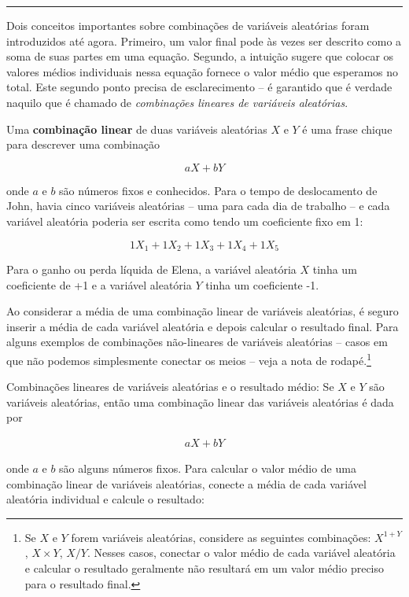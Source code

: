 \documentclass[
]{book}
\theoremstyle{definition}
\theoremstyle{definition}
\theoremstyle{definition}
\theoremstyle{definition}
\theoremstyle{remark}
\begin{document}
\begin{center}\rule{0.5\linewidth}{0.5pt}\end{center}

Dois conceitos importantes sobre combinações de variáveis aleatórias foram introduzidos até agora. Primeiro, um valor final pode às vezes ser descrito como a soma de suas partes em uma equação. Segundo, a intuição sugere que colocar os valores médios individuais nessa equação fornece o valor médio que esperamos no total. Este segundo ponto precisa de esclarecimento -- é garantido que é verdade naquilo que é chamado de \emph{combinações lineares de variáveis aleatórias}.

Uma \textbf{combinação linear} de duas variáveis aleatórias \(X\) e \(Y\) é uma frase chique para descrever uma combinação

\[ aX + bY\]

onde \(a\) e \(b\) são números fixos e conhecidos. Para o tempo de deslocamento de John, havia cinco variáveis aleatórias -- uma para cada dia de trabalho -- e cada variável aleatória poderia ser escrita como tendo um coeficiente fixo em 1:

\[1X_1 + 1 X_2 + 1 X_3 + 1 X_4 + 1 X_5\]

Para o ganho ou perda líquida de Elena, a variável aleatória \(X\) tinha um coeficiente de +1 e a variável aleatória \(Y\) tinha um coeficiente -1.

Ao considerar a média de uma combinação linear de variáveis aleatórias, é seguro inserir a média de cada variável aleatória e depois calcular o resultado final. Para alguns exemplos de combinações não-lineares de variáveis aleatórias -- casos em que não podemos simplesmente conectar os meios -- veja a nota de rodapé.\footnote{Se \(X\) e \(Y\) forem variáveis aleatórias, considere as seguintes combinações: \(X^{1+Y}\), \(X\times Y\), \(X/Y\). Nesses casos, conectar o valor médio de cada variável aleatória e calcular o resultado geralmente não resultará em um valor médio preciso para o resultado final.}

Combinações lineares de variáveis aleatórias e o resultado médio: Se \(X\) e \(Y\) são variáveis aleatórias, então uma combinação linear das variáveis aleatórias é dada por

\begin{align}
aX + bY
\label{eq:linComboOfRandomVariablesXAndY}
\end{align}

onde \(a\) e \(b\) são alguns números fixos. Para calcular o valor médio de uma combinação linear de variáveis aleatórias, conecte a média de cada variável aleatória individual e calcule o resultado:
\end{document}
